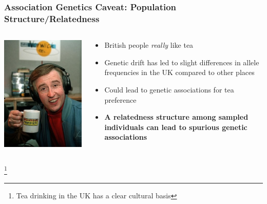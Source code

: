 \documentclass[xcolor=dvipsnames]{beamer}
\newcommand\blfootnote[1]{%
	\begingroup
	\renewcommand\thefootnote{}\footnote{#1}%
	\addtocounter{footnote}{-1}%
	\endgroup
}
\begin{document}
\begin{frame}
	
	\frametitle{Association Genetics Caveat: Population Structure/Relatedness}

\begin{columns}
	\begin{column}{0.4\textwidth}
		\includegraphics[keepaspectratio, width  = \textwidth]{img/alan}				
	\end{column}
	\begin{column}{0.7\textwidth}
		\begin{itemize}
			\item British people \textit{really} like tea 
			\vspace{7.5pt}
			\item Genetic drift has led to slight differences in allele frequencies in the UK compared to other places
			\vspace{7.5pt}
			\item Could lead to genetic associations for tea preference
			\vspace{7.5pt}
			\item\textbf{ A relatedness structure among sampled individuals can lead to spurious genetic associations}
			
			\vspace{10pt}
		\end{itemize}
	\end{column}
\end{columns}
\blfootnote{ Tea drinking in the UK has a clear cultural basis}
\end{frame}
\end{document}
